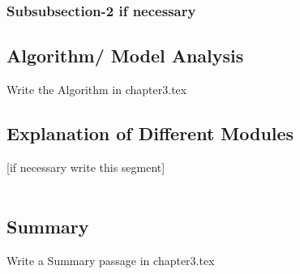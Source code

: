 \subsubsection{Subsubsection-2 if necessary}




\subsection{Algorithm/ Model Analysis}
Write the Algorithm in chapter3.tex

\subsection{Explanation of Different Modules}
[if necessary write this segment]
\\
\\
\subsection*{Summary}
Write a Summary passage in chapter3.tex

\clearpage

